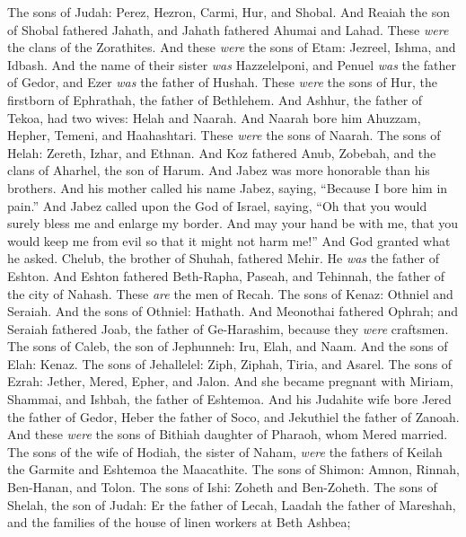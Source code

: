 \begin{biblechapter} %
 The sons of Judah: Perez, Hezron, Carmi, Hur, and Shobal.
\verse And Reaiah the son of Shobal fathered Jahath, and Jahath fathered Ahumai and Lahad. These \textit{were} the clans of the Zorathites.
\verse And these \textit{were} the sons of Etam: Jezreel, Ishma, and Idbash. And the name of their sister \textit{was} Hazzelelponi,
\verse and Penuel \textit{was} the father of Gedor, and Ezer \textit{was} the father of Hushah. These \textit{were} the sons of Hur, the firstborn of Ephrathah, the father of Bethlehem.
\verse And Ashhur, the father of Tekoa, had two wives: Helah and Naarah.
\verse And Naarah bore him Ahuzzam, Hepher, Temeni, and Haahashtari. These \textit{were} the sons of Naarah.
\verse The sons of Helah: Zereth, Izhar, and Ethnan.
\verse And Koz fathered Anub, Zobebah, and the clans of Aharhel, the son of Harum.
\verse And Jabez was more honorable than his brothers. And his mother called his name Jabez, saying, “Because I bore him in pain.”
\verse And Jabez called upon the God of Israel, saying, “Oh that you would surely bless me and enlarge my border. And may your hand be with me, that you would keep me from evil so that it might not harm me!” And God granted what he asked.
\verse Chelub, the brother of Shuhah, fathered Mehir. He \textit{was} the father of Eshton.
\verse And Eshton fathered Beth-Rapha, Paseah, and Tehinnah, the father of the city of Nahash. These \textit{are} the men of Recah.
\verse The sons of Kenaz: Othniel and Seraiah. And the sons of Othniel: Hathath.
\verse And Meonothai fathered Ophrah; and Seraiah fathered Joab, the father of Ge-Harashim, because they \textit{were} craftsmen.
\verse The sons of Caleb, the son of Jephunneh: Iru, Elah, and Naam. And the sons of Elah: Kenaz.
\verse The sons of Jehallelel: Ziph, Ziphah, Tiria, and Asarel.
\verse The sons of Ezrah: Jether, Mered, Epher, and Jalon. And she became pregnant with Miriam, Shammai, and Ishbah, the father of Eshtemoa.
\verse And his Judahite wife bore Jered the father of Gedor, Heber the father of Soco, and Jekuthiel the father of Zanoah. And these \textit{were} the sons of Bithiah daughter of Pharaoh, whom Mered married.
\verse The sons of the wife of Hodiah, the sister of Naham, \textit{were} the fathers of Keilah the Garmite and Eshtemoa the Maacathite.
\verse The sons of Shimon: Amnon, Rinnah, Ben-Hanan, and Tolon. The sons of Ishi: Zoheth and Ben-Zoheth.
\verse The sons of Shelah, the son of Judah: Er the father of Lecah, Laadah the father of Mareshah, and the families of the house of linen workers at Beth Ashbea;

\end{biblechapter}

